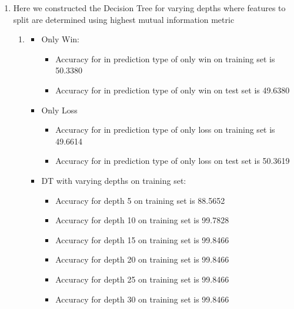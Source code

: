 \begin{enumerate}[label=(\alph*)]

    \item Here we constructed the Decision Tree for varying depths where features to split are determined using highest mutual information metric
          \begin{enumerate}[label=\roman*.]
              \item
                    \begin{itemize}
                        \item Only Win:
                              \begin{itemize}
                                  \item Accuracy for in prediction type of only win on training set is 50.3380
                                  \item Accuracy for in prediction type of only win on test set is 49.6380
                              \end{itemize}
                        \item Only Loss
                              \begin{itemize}
                                  \item Accuracy for in prediction type of only loss on training set is 49.6614
                                  \item Accuracy for in prediction type of only loss on test set is 50.3619
                              \end{itemize}
                        \item DT with varying depths on training set:
                              \begin{itemize}
                                  \item Accuracy for depth 5 on training set is 88.5652
                                  \item Accuracy for depth 10 on training set is 99.7828
                                  \item Accuracy for depth 15 on training set is 99.8466
                                  \item Accuracy for depth 20 on training set is 99.8466
                                  \item Accuracy for depth 25 on training set is 99.8466
                                  \item Accuracy for depth 30 on training set is 99.8466
                              \end{itemize}

\end{itemize}
\end{enumerate}
\end{enumerate}
